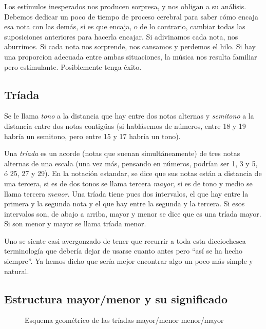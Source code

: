 \documentclass[]{report}
\begin{document}
Los estímulos inesperados nos producen sorpresa, y nos obligan a su análisis. Debemos dedicar un poco de tiempo de proceso cerebral para saber cómo encaja esa nota con las demás, si es que encaja, o de lo contrario, cambiar todas las suposiciones anteriores para hacerla encajar. Si adivinamos cada nota, nos aburrimos. Si cada nota nos sorprende, nos cansamos y perdemos el hilo. Si hay una proporcion adecuada entre ambas situaciones, la música nos resulta familiar pero estimulante. Posiblemente tenga éxito.

\subsection{Tríada}

Se le llama \emph{tono} a la distancia que hay entre dos notas alternas y \emph{semitono} a la distancia entre dos notas contigüas (si hablásemos de números, entre 18 y 19 habría un semitono, pero entre 15 y 17 habría un tono).

Una \emph{tríada} es un acorde (notas que suenan simultáneamente) de tres notas alternas de una escala (una vez más, pensando en números, podrían ser 1, 3 y 5, ó 25, 27 y 29). En la notación estandar, se dice que sus notas están a distancia de una tercera, si es de dos tonos se llama tercera \emph{mayor}, si es de tono y medio se llama tercera \emph{menor}. Una tríada tiene pues dos intervalos, el que hay entre la primera y la segunda nota y el que hay entre la segunda y la tercera. Si esos intervalos son, de abajo a arriba, mayor y menor se dice que es una tríada mayor. Si son menor y mayor se llama tríada menor.

Uno se siente casi avergonzado de tener que recurrir a toda esta dieciochesca terminología que debería dejar de usarse cuanto antes pero ``así se ha hecho siempre''. Ya hemos dicho que sería mejor encontrar algo un poco más simple y natural.

\subsection{Estructura mayor/menor y su significado}

\begin{figure}[htbp]
	\center%
	\vspace{12pt}
	\caption{Esquema geométrico de las tríadas mayor/menor menor/mayor}\label{fig:maj-minor-scheme}
\end{figure}
\end{document}
